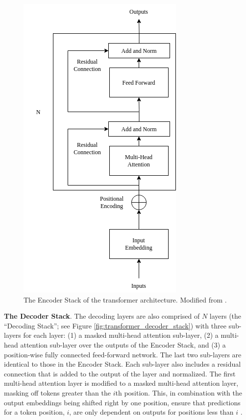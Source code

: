 \documentclass[12pt]{article}
\begin{document}
\begin{figure}
    \centering
    \includegraphics[width=0.5\linewidth]{figures/transformer_encoder_stack.png}
    \caption{The Encoder Stack of the transformer architecture. Modified from \cite{vaswani_attention_2017}.}
    \label{fig:transformer_encoder_stack}
\end{figure}

\textbf{The Decoder Stack}. The decoding layers are also comprised of $N$ layers (the ``Decoding Stack''; see Figure
\ref{fig:transformer_decoder_stack}) with three sub-layers for each layer: (1) a masked multi-head attention sub-layer, (2) a multi-head attention
sub-layer over the outputs of the Encoder Stack, and (3) a position-wise fully connected feed-forward network. The last two sub-layers are identical
to those in the Encoder Stack. Each sub-layer also includes a residual connection that is added to the output of the layer and normalized. The first
multi-head attention layer is modified to a masked multi-head attention layer, masking off tokens greater than the $i$th position. This, in
combination with the output embeddings being shifted right by one position, ensure that predictions for a token position, $i$, are only dependent on
outputs for positions less than $i$ \cite{vaswani_attention_2017}.
\end{document}
